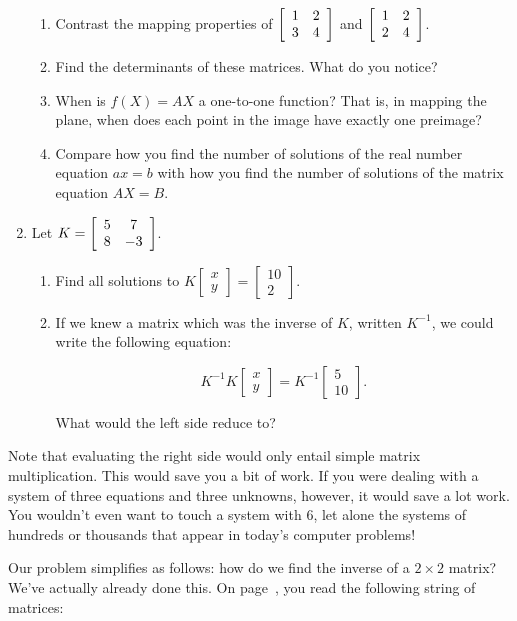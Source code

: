 \documentclass[../gatm.tex]{subfiles}
\begin{document}
\begin{enumerate}
\begin{enumerate}
\item Contrast the mapping properties of $\left[\begin{array}{cc} 1 & 2 \\ 3 & 4 \end{array}\right]$ and $\left[\begin{array}{cc} 1 & 2 \\ 2 & 4 \end{array}\right]$.
\item Find the determinants of these matrices. What do you notice?
\item When is $f(X)=AX$ a one-to-one function? That is, in mapping the plane, when does each point in the image have exactly one preimage?
\item Compare how you find the number of solutions of the real number equation $ax=b$ with how you find the number of solutions of the matrix equation $AX=B$.
\end{enumerate}
\item Let $K=\left[\begin{array}{cc} 5 & 7 \\ 8 & -3 \end{array}\right]$.\begin{enumerate}
\item Find all solutions to $K\left[\begin{array}{c} x \\ y \end{array}\right]=\left[\begin{array}{c} 10 \\ 2 \end{array}\right]$.
\item If we knew a matrix which was the inverse of $K$, written $K^{-1}$, we could write the following equation:

$$K^{-1}K\left[\begin{array}{c} x \\ y \end{array}\right]=K^{-1}\left[\begin{array}{c} 5 \\ 10 \end{array}\right].$$

What would the left side reduce to?
\end{enumerate}
\setcounter{problem_i}{\value{enumi}}
\end{enumerate}

\noindent Note that evaluating the right side would only entail simple matrix multiplication. This would save you a bit of work. If you were dealing with a system of three equations and three unknowns, however, it would save a lot work. You wouldn't even want to touch a system with $6$, let alone the systems of hundreds or thousands that appear in today's computer problems!

Our problem simplifies as follows: how do we find the inverse of a $2\times 2$ matrix? We've actually already done this. On page~\pageref{prob:list_of_matrices}, you read the following string of matrices:
\end{document}
